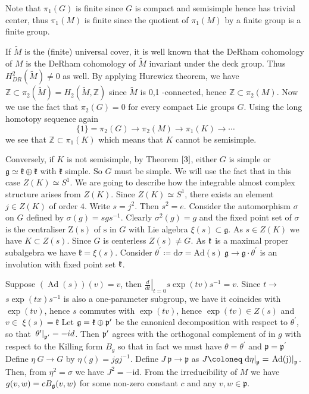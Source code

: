 Note that $\pi_{1}(G)$ is finite since $G$ is compact and
semisimple hence has trivial center, thus $\pi_{1}(M)$ is finite
since the quotient of $\pi_{1}(M)$ by a finite group is a finite
group.

If $\tilde{M}$ is the (finite) universal cover, it is well known
that the DeRham cohomology of $M$ is the DeRham cohomology of
$\tilde{M}$ invariant under the deck group. Thus $H_{D
R}^{2}(\tilde{M}) \neq 0$ as well. By applying Hurewicz theorem,
we have $\mathbb{Z} \subset \pi_{2}(\tilde{M})=H_{2}(\tilde{M},
\mathbb{Z})$ since $\tilde{M}$ is 0,1 -connected, hence
$\mathbb{Z} \subset \pi_{2}(M) .$ Now
we use the fact that $\pi_{2}(G)=0$ for every compact Lie groups
$G$. Using the long homotopy sequence again
\[
\{1\}=\pi_{2}(G) \longrightarrow \pi_{2}(M) \longrightarrow
\pi_{1}(K) \longrightarrow \cdots
\]
we see that $\mathbb{Z} \subset \pi_{1}(K)$ which means that $K$
cannot be semisimple.


Conversely, if $K$ is not semisimple, by Theorem $\ref{3}$,
either $G$ is simple or $\mathfrak{g} \simeq \mathfrak{k} \oplus
\mathfrak{k}$ with $\mathfrak{k}$ simple. So $G$ must be simple.
We will use the fact that in this case $Z(K) \simeq S^{1}$. We
are going to describe how the integrable almost complex structure
arises from $Z(K)$. Since $Z(K) \simeq S^{1}$, there exists an
element $j \in Z(K)$ of order $4 .$ Write $s=j^{2}$. Then
$s^{2}=e$. Consider the automorphism $\sigma$ on $G$ defined by
$\sigma(g)=s g s^{-1}$. Clearly $\sigma^{2}(g)=g$ and the fixed
point set of $\sigma$ is the centraliser $\mathrm{Z}(\mathrm{s})$
of $\mathrm{s}$ in $G$ with Lie algebra $\xi(s) \subset
\mathfrak{g} .$ As $s \in Z(K)$ we have $K \subset Z(s) .$ Since
$G$ is centerless $Z(s) \neq G .$ As ${\mathfrak k}$ is a maximal proper
subalgebra we have $\mathfrak{k}=\xi(s)$. Consider
$\theta^{\prime}\coloneq \mathrm{d} \sigma=\mathrm{Ad}(\mathrm{s})\:
\mathfrak{g} \rightarrow \mathfrak{g} \cdot \theta^{\prime}$ is
an involution with fixed point set
${\mathfrak k}$.


 Suppose $(\operatorname{Ad}(s))(v)=v$, then $\left.\frac{d}{d
 t}\right|_{t=0} s \exp (t v) s^{-1}=v .$ Since $t \rightarrow$
$s \exp (t x) s^{-1}$ is also a one-parameter subgroup, we have
it coincides with $\exp (t v)$, hence $s$ commutes with $\exp (t
v)$, hence $\exp (t v) \in Z(s)$ and $v \in$
$\xi(s)=\mathfrak{k}$
Let ${\mathfrak g}={\mathfrak k}\oplus{\mathfrak p}^{\prime}$ be the canonical decomposition
with respect to $\theta^{\prime}$, so that
$\left.\theta^{\prime}\right|_{{\mathfrak p}^{\prime}}=-i d$. Then
${\mathfrak p}^{\prime}$ agrees with the orthogonal complement of in $g$
with
respect to the Killing form $B_{g}$ so that in fact we must have
$\theta=\theta^{\prime}$ and $\mathfrak{p}=\mathfrak{p}^{\prime}$
Define $\eta\: G \rightarrow G$ by $\eta(g)=j g j^{-1}$. Define
$J\: \mathfrak{p} \rightarrow \mathfrak{p}$ as
$J\coloneq \left.\mathrm{d}
\eta\right|_{\ssp}=\left.\operatorname{Ad}(\mathrm{j})\right|_{\ssp}$.
Then, from $\eta^{2}=\sigma$ we have $J^{2}=-\mathrm{id}$. From
the irreducibility of $M$ we have $g(v, w)=c B_{{\mathfrak g}}(v, w)$ for
some non-zero constant $c$ and any $v, w \in \mathfrak{p} .$

